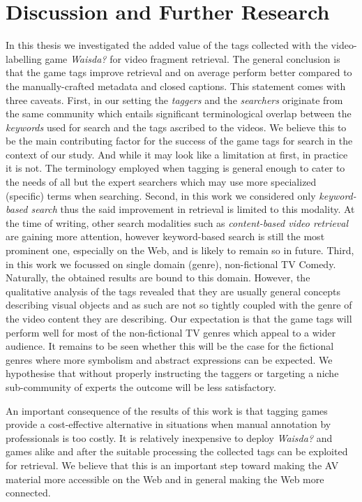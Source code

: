 \section{Discussion and Further Research}
In this thesis we investigated the added value of the tags collected with the video-labelling game \textit{Waisda?} for video fragment retrieval. The general conclusion is that the game tags improve retrieval and on average perform better compared to the manually-crafted metadata and closed captions. This statement comes with three caveats. First, in our setting the \textit{taggers} and the \textit{searchers} originate from the same community which entails significant terminological overlap between the \textit{keywords} used for search and the tags ascribed to the videos. We believe this to be the main contributing factor for the success of the game tags for search in the context of our study. And while it may look like a limitation at first, in practice it is not. The terminology employed when tagging is general enough to cater to the needs of all but the expert searchers which may use more specialized (specific) terms when searching. Second, in this work we considered only \textit{keyword-based search} thus the said improvement in retrieval is limited to this modality. At the time of writing, other search modalities such as \textit{content-based video retrieval} \cite{veltkamp2013state} are gaining more attention, however keyword-based search is still the most prominent one, especially on the Web, and is likely to remain so in future. Third, in this work we focussed on single domain (genre), non-fictional TV Comedy. Naturally, the obtained results are bound to this domain. However, the qualitative analysis of the tags revealed that they are usually general concepts describing visual objects and as such are not so tightly coupled with the genre of the video content they are describing. Our expectation is that the game tags will perform well for most of the non-fictional TV genres which appeal to a wider audience. It remains to be seen whether this will be the case for the fictional genres where more symbolism and abstract expressions can be expected. We hypothesise that without properly instructing the taggers or targeting a niche sub-community of experts the outcome will be less satisfactory.

An important consequence of the results of this work is that tagging games provide a cost-effective alternative in situations when manual annotation by professionals is too costly. It is relatively inexpensive to deploy \textit{Waisda?} and games alike and after the suitable processing the collected tags can be exploited for retrieval. We believe that this is an important step toward making the AV material more accessible on the Web and in general making the Web more connected.

